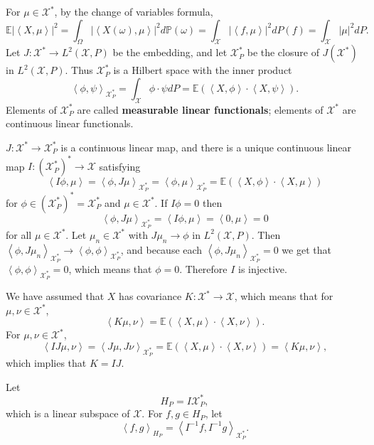 \documentclass{article}
\newcommand{\inner}[2]{\left\langle #1, #2 \right\rangle}
\theoremstyle{definition}
\begin{document}
For $\mu \in \mathscr{X}^*$, by the change of variables formula,
\[
\mathbb{E} |\inner{X}{\mu}|^2 = 
\int_\Omega |\inner{X(\omega)}{\mu}|^2 d\mathbb{P}(\omega)
=\int_{\mathscr{X}} |\inner{f}{\mu}|^2 dP(f)
=\int_{\mathscr{X}} |\mu|^2 dP.
\]
Let $J:\mathscr{X}^* \to L^2(\mathscr{X},P)$ be the embedding, and let
$\mathscr{X}_P^*$ be the closure of $J(\mathscr{X}^*)$ in $L^2(\mathscr{X},P)$. Thus 
$\mathscr{X}_P^*$ is a Hilbert space with the inner product
\[
\inner{\phi}{\psi}_{\mathscr{X}_P^*} = \int_{\mathscr{X}} \phi \cdot \psi dP = \mathbb{E}(\inner{X}{\phi} \cdot \inner{X}{\psi}).
\]
Elements of $\mathscr{X}_P^*$ are called \textbf{measurable linear functionals}; elements of $\mathscr{X}^*$
are continuous linear functionals. 


$J:\mathscr{X}^* \to \mathscr{X}_P^*$ is a continuous linear map, and there is a unique continuous linear
map $I:(\mathscr{X}_P^*)^* \to \mathscr{X}$ satisfying
\[
\inner{I \phi}{\mu} = \inner{\phi}{J\mu}_{\mathscr{X}_P^*} = \inner{\phi}{\mu}_{\mathscr{X}_P^*} = \mathbb{E}(\inner{X}{\phi}\cdot \inner{X}{\mu})
\]
for $\phi \in (\mathscr{X}_P^*)^*=\mathscr{X}_P^*$
and $\mu \in \mathscr{X}^*$.
If $I \phi = 0$ then 
\[
\inner{\phi}{J \mu}_{\mathscr{X}_P^*} = \inner{I \phi}{\mu} = \inner{0}{\mu} = 0
\]
for all $\mu \in \mathscr{X}^*$. Let $\mu_n \in \mathscr{X}^*$ with
$J\mu_n \to \phi$ in $L^2(\mathscr{X},P)$. Then $\inner{\phi}{J\mu_n}_{\mathscr{X}_P^*} \to \inner{\phi}{\phi}_{\mathscr{X}_P^*}$, and because
each $\inner{\phi}{J\mu_n}_{\mathscr{X}_P^*}=0$ we get that $\inner{\phi}{\phi}_{\mathscr{X}_P^*}=0$, which means that
$\phi=0$. Therefore $I$ is injective. 

We have assumed that $X$ has covariance $K:\mathscr{X}^* \to \mathscr{X}$, which means that
for $\mu,\nu \in \mathscr{X}^*$,
\[
\inner{K\mu}{\nu} = \mathbb{E}(\inner{X}{\mu}\cdot \inner{X}{\nu}).
\]
For $\mu,\nu \in \mathscr{X}^*$,
\[
\inner{IJ\mu}{\nu}=\inner{J\mu}{J\nu}_{\mathscr{X}_P^*}
=\mathbb{E}(\inner{X}{\mu}\cdot \inner{X}{\nu})
=\inner{K\mu}{\nu},
\]
which implies that $K=IJ$. 

Let
\[
H_P = I \mathscr{X}_P^*,
\]
which is a linear subspace of $\mathscr{X}$. For $f,g \in H_P$,
let
\[
\inner{f}{g}_{H_P} = \inner{I^{-1}f}{I^{-1}g}_{\mathscr{X}_P^*}.
\]
\end{document}
